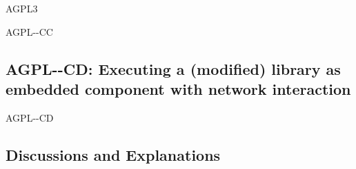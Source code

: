 \begin{license}{AGPL3}
\begin{lsuc}{AGPL-\ver-CC}
  \useCaseC

  \begin{lsucrequires}
    \lsucmandatory{\keepLicenseElements}
    \lsucmandatory{\gplthreeEnsureCopyrightNoticeBinary}
    \lsucmandatory{\giveLicense}\passingFilesCorrectly
    \lsucmandatory{\retainCopyrightNotices}
    \lsucmandatory{\markProgramModifications}
    \lsucmandatory{\addToCopyrightDialogApp}
    \lsucmandatory{\arrangeProgramChanges}\howToApplyTheseTerms
    \lsucmandatory{\makeExecModifiedSourceAvailable}
    \lsucmandatory{\describeHowToGetSource}
    \lsucoptional{\createChangelog}
    \lsucoptional{\addToDocumentation}
  \end{lsucrequires}

  \begin{lsucprohibits}
    \lsucitem{\noPatentLitigation}
  \end{lsucprohibits}
\end{lsuc}

\subsection{AGPL-\ver-CD: Executing a (modified) library as embedded component
with network interaction}
\begin{lsuc}{AGPL-\ver-CD}
  \useCaseD

  \begin{lsucrequires}
    \lsucmandatory{\keepLicenseElements}
    \lsucmandatory{\gplthreeEnsureCopyrightNoticeBinary}
    \lsucmandatory{\giveLicense}\passingFilesCorrectly
    \lsucmandatory{\retainCopyrightNotices}
    \lsucmandatory{\makeExecAllSourcesAvailable}
    \lsucmandatory{\describeHowToGetSource}
    \lsucmandatory{\addToCopyrightDialogLib}
    \lsucmandatory{\markEmbeddedModifications}
    \lsucmandatory{\arrangeEmbeddedChanges}\howToApplyTheseTerms
    \lsucmandatory{\arrangeEnclosingBinaries}
    \lsucoptional{\createChangelog}
    \lsucoptional{\addToDocumentation}
  \end{lsucrequires}

  \begin{lsucprohibits}
    \lsucitem{\noPatentLitigation}
  \end{lsucprohibits}
\end{lsuc}
\end{license}


\subsection{Discussions and Explanations}
\label{AGPL3Discussion}
  


